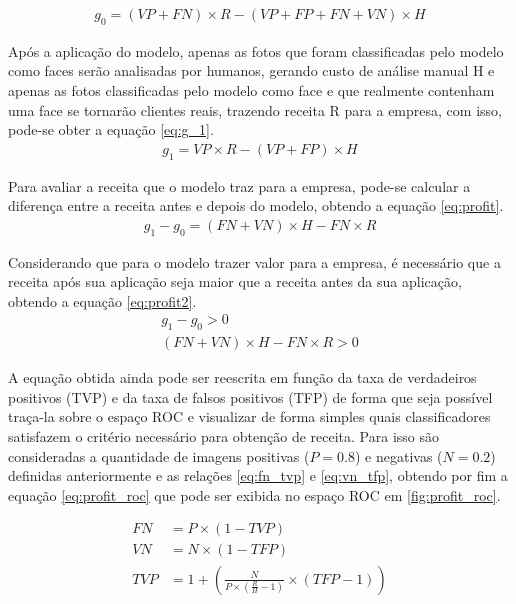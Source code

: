 \begin{align} \label{eq:g_0}
    g_0 = (VP+FN) \times R - (VP+FP+FN+VN) \times H
\end{align}

Após a aplicação do modelo, apenas as fotos que foram classificadas pelo modelo como faces serão analisadas por humanos, gerando custo de análise manual H e apenas as fotos classificadas pelo modelo como face e que realmente contenham uma face se tornarão clientes reais, trazendo receita R para a empresa, com isso, pode-se obter a equação \ref{eq:g_1}.
\begin{align} \label{eq:g_1}
    g_1 = VP \times R - (VP+FP) \times H
\end{align}

Para avaliar a receita que o modelo traz para a empresa, pode-se calcular a diferença entre a receita antes e depois do modelo, obtendo a equação \ref{eq:profit}.
\begin{align} \label{eq:profit}
    g_1 - g_0 = (FN + VN) \times H - FN \times R
\end{align}

Considerando que para o modelo trazer valor para a empresa, é necessário que a receita após sua aplicação seja maior que a receita antes da sua aplicação, obtendo a equação \ref{eq:profit2}.
\begin{align} \label{eq:profit2}
    g_1 - g_0 > 0 \\
    (FN + VN) \times H - FN \times R > 0
\end{align}

A equação obtida ainda pode ser reescrita em função da taxa de verdadeiros positivos (TVP) e da taxa de falsos positivos (TFP) de forma que seja possível traça-la sobre o espaço ROC e visualizar de forma simples quais classificadores satisfazem o critério necessário para obtenção de receita. Para isso são consideradas a quantidade de imagens positivas ($ P = 0.8 $) e negativas ($ N = 0.2 $) definidas anteriormente e as relações \ref{eq:fn_tvp} e \ref{eq:vn_tfp}, obtendo por fim a equação \ref{eq:profit_roc} que pode ser exibida no espaço ROC em \ref{fig:profit_roc}.

\begin{align} 
    \label{eq:fn_tvp}
    FN &= P \times (1-TVP) \\
    \label{eq:vn_tfp}
    VN &= N \times (1-TFP) \\
    \label{eq:profit_roc}
    TVP &= 1 + \left( \frac{N}{P \times \left( \frac{R}{H}-1 \right) } \times (TFP - 1) \right)
\end{align}

